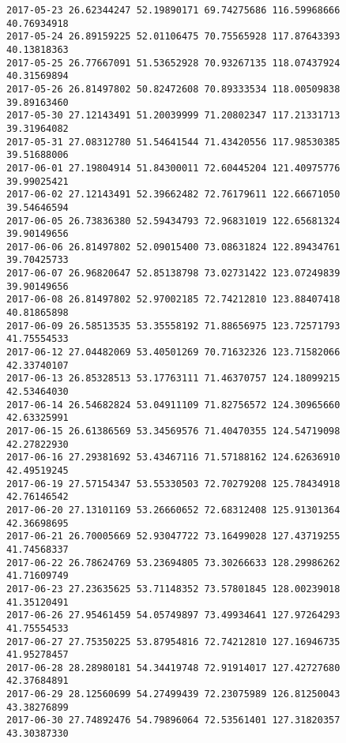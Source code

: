\documentclass[11pt]{article}
\begin{document}
\begin{Verbatim}[commandchars=\\\{\}]
2017-05-23 26.62344247 52.19890171 69.74275686 116.59968666 40.76934918   
2017-05-24 26.89159225 52.01106475 70.75565928 117.87643393 40.13818363   
2017-05-25 26.77667091 51.53652928 70.93267135 118.07437924 40.31569894   
2017-05-26 26.81497802 50.82472608 70.89333534 118.00509838 39.89163460   
2017-05-30 27.12143491 51.20039999 71.20802347 117.21331713 39.31964082   
2017-05-31 27.08312780 51.54641544 71.43420556 117.98530385 39.51688006   
2017-06-01 27.19804914 51.84300011 72.60445204 121.40975776 39.99025421   
2017-06-02 27.12143491 52.39662482 72.76179611 122.66671050 39.54646594   
2017-06-05 26.73836380 52.59434793 72.96831019 122.65681324 39.90149656   
2017-06-06 26.81497802 52.09015400 73.08631824 122.89434761 39.70425733   
2017-06-07 26.96820647 52.85138798 73.02731422 123.07249839 39.90149656   
2017-06-08 26.81497802 52.97002185 72.74212810 123.88407418 40.81865898   
2017-06-09 26.58513535 53.35558192 71.88656975 123.72571793 41.75554533   
2017-06-12 27.04482069 53.40501269 70.71632326 123.71582066 42.33740107   
2017-06-13 26.85328513 53.17763111 71.46370757 124.18099215 42.53464030   
2017-06-14 26.54682824 53.04911109 71.82756572 124.30965660 42.63325991   
2017-06-15 26.61386569 53.34569576 71.40470355 124.54719098 42.27822930   
2017-06-16 27.29381692 53.43467116 71.57188162 124.62636910 42.49519245   
2017-06-19 27.57154347 53.55330503 72.70279208 125.78434918 42.76146542   
2017-06-20 27.13101169 53.26660652 72.68312408 125.91301364 42.36698695   
2017-06-21 26.70005669 52.93047722 73.16499028 127.43719255 41.74568337   
2017-06-22 26.78624769 53.23694805 73.30266633 128.29986262 41.71609749   
2017-06-23 27.23635625 53.71148352 73.57801845 128.00239018 41.35120491   
2017-06-26 27.95461459 54.05749897 73.49934641 127.97264293 41.75554533   
2017-06-27 27.75350225 53.87954816 72.74212810 127.16946735 41.95278457   
2017-06-28 28.28980181 54.34419748 72.91914017 127.42727680 42.37684891   
2017-06-29 28.12560699 54.27499439 72.23075989 126.81250043 43.38276899   
2017-06-30 27.74892476 54.79896064 72.53561401 127.31820357 43.30387330   


\end{Verbatim}
\end{document}
